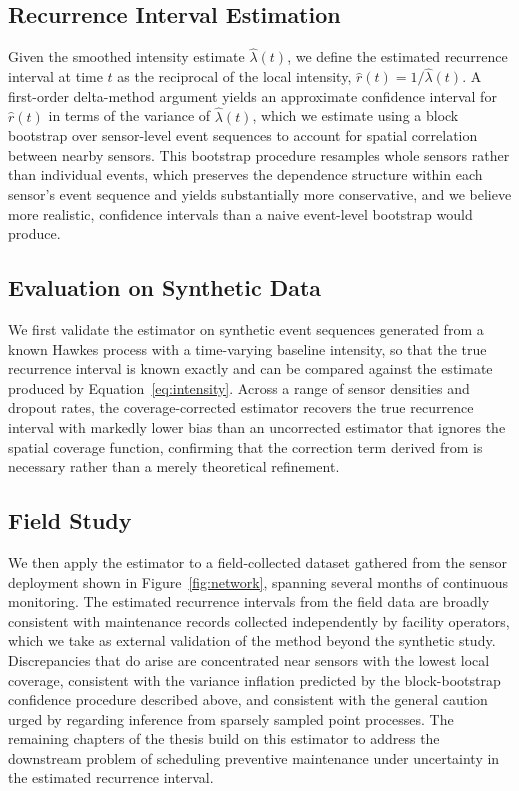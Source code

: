 \subsection{Recurrence Interval Estimation}
Given the smoothed intensity estimate $\hat{\lambda}(t)$, we define the
estimated recurrence interval at time $t$ as the reciprocal of the local
intensity, $\hat{r}(t) = 1 / \hat{\lambda}(t)$. A first-order delta-method
argument yields an approximate confidence interval for $\hat{r}(t)$ in terms
of the variance of $\hat{\lambda}(t)$, which we estimate using a block
bootstrap over sensor-level event sequences to account for spatial
correlation between nearby sensors. This bootstrap procedure resamples
whole sensors rather than individual events, which preserves the
dependence structure within each sensor's event sequence and yields
substantially more conservative, and we believe more realistic, confidence
intervals than a naive event-level bootstrap would produce.

\subsection{Evaluation on Synthetic Data}
We first validate the estimator on synthetic event sequences generated from
a known Hawkes process with a time-varying baseline intensity, so that the
true recurrence interval is known exactly and can be compared against the
estimate produced by Equation~\eqref{eq:intensity}. Across a range of
sensor densities and dropout rates, the coverage-corrected estimator
recovers the true recurrence interval with markedly lower bias than an
uncorrected estimator that ignores the spatial coverage function, confirming
that the correction term derived from \citet{fictional2020} is necessary
rather than a merely theoretical refinement.

\subsection{Field Study}
We then apply the estimator to a field-collected dataset gathered from the
sensor deployment shown in Figure~\ref{fig:network}, spanning several
months of continuous monitoring. The estimated recurrence intervals from
the field data are broadly consistent with maintenance records collected
independently by facility operators, which we take as external validation
of the method beyond the synthetic study. Discrepancies that do arise are
concentrated near sensors with the lowest local coverage, consistent with
the variance inflation predicted by the block-bootstrap confidence
procedure described above, and consistent with the general caution urged
by \citep{daley2003} regarding inference from sparsely sampled point
processes. The remaining chapters of the thesis build on this estimator to
address the downstream problem of scheduling preventive maintenance under
uncertainty in the estimated recurrence interval.
